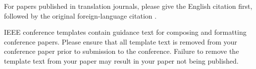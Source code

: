 \documentclass[conference]{IEEEtran}
\begin{document}
For papers published in translation journals, please give the English 
citation first, followed by the original foreign-language citation \cite{b6}.



\vspace{12pt}
\color{red}
IEEE conference templates contain guidance text for composing and formatting conference papers. Please ensure that all template text is removed from your conference paper prior to submission to the conference. Failure to remove the template text from your paper may result in your paper not being published.
\end{document}

